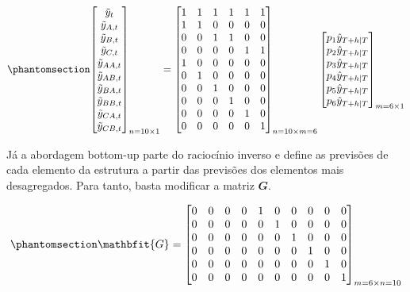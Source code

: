 \documentclass[
  12pt,
  twoside,
  openright,
  a4paper,
  chapter=TITLE,
  section=TITLE,
  brazil]{abntex2}
\begin{document}
\begin{equation}\phantomsection\label{eq-matriz_topdown3}{
\begin{bmatrix}
    \tilde{y}_{t} \\
    \tilde{y}_{A, t} \\
    \tilde{y}_{B, t} \\
    \tilde{y}_{C, t} \\
    \tilde{y}_{AA, t} \\
    \tilde{y}_{AB, t} \\
    \tilde{y}_{BA, t} \\
    \tilde{y}_{BB, t} \\
    \tilde{y}_{CA, t} \\
    \tilde{y}_{CB, t}
\end{bmatrix}_{n=10 \times 1}
=
\begin{bmatrix}
    1 & 1 & 1 & 1 & 1 & 1 \\
    1 & 1 & 0 & 0 & 0 & 0 \\
    0 & 0 & 1 & 1 & 0 & 0 \\
    0 & 0 & 0 & 0 & 1 & 1 \\
    1 & 0 & 0 & 0 & 0 & 0 \\
    0 & 1 & 0 & 0 & 0 & 0 \\
    0 & 0 & 1 & 0 & 0 & 0 \\
    0 & 0 & 0 & 1 & 0 & 0 \\
    0 & 0 & 0 & 0 & 1 & 0 \\
    0 & 0 & 0 & 0 & 0 & 1
\end{bmatrix}_{n=10 \times m=6}
\begin{bmatrix}
    p_1\hat{y}_{T+h|T} \\
    p_2\hat{y}_{T+h|T} \\
    p_3\hat{y}_{T+h|T} \\
    p_4\hat{y}_{T+h|T} \\
    p_5\hat{y}_{T+h|T} \\
    p_6\hat{y}_{T+h|T}
\end{bmatrix}_{m=6 \times 1}
}\end{equation}

Já a abordagem bottom-up parte do raciocínio inverso e define as
previsões de cada elemento da estrutura a partir das previsões dos
elementos mais desagregados. Para tanto, basta modificar a matriz
\(\mathbfit{G}\).

\begin{equation}\phantomsection\label{eq-matriz_gbu}{
\mathbfit{G}
=
\begin{bmatrix}
    0 & 0 & 0 & 0 & 1 & 0 & 0 & 0 & 0 & 0 \\
    0 & 0 & 0 & 0 & 0 & 1 & 0 & 0 & 0 & 0 \\
    0 & 0 & 0 & 0 & 0 & 0 & 1 & 0 & 0 & 0 \\
    0 & 0 & 0 & 0 & 0 & 0 & 0 & 1 & 0 & 0 \\
    0 & 0 & 0 & 0 & 0 & 0 & 0 & 0 & 1 & 0 \\
    0 & 0 & 0 & 0 & 0 & 0 & 0 & 0 & 0 & 1
\end{bmatrix}_{m=6 \times n=10}
}\end{equation}
\end{document}
